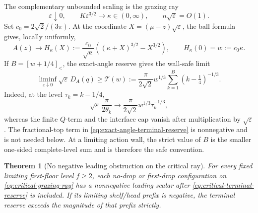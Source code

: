 \documentclass[11pt]{article}
\newtheorem{theorem}{Theorem}[section]
\theoremstyle{remark}
\newcommand{\sbr}[1]{[#1]_{<}}
\begin{document}
The complementary unbounded scaling is the grazing ray
\begin{equation}
 \varepsilon\downarrow0,\qquad
 K\varepsilon^{3/2}\longrightarrow\kappa\in(0,\infty),
 \qquad n\sqrt\varepsilon=O(1).
 \label{eq:critical-grazing-ray}
\end{equation}
Set $c_0=2\sqrt2/(3\pi)$.  At the coordinate
$X=(\mu-z)\sqrt\varepsilon$, the ball formula gives, locally uniformly,
\begin{equation}
 A(z)\longrightarrow
 H_\kappa(X):=\frac{c_0}{\sqrt\kappa}
 \left((\kappa+X)^{3/2}-X^{3/2}\right),
 \qquad H_\kappa(0)=w:=c_0\kappa.
 \label{eq:critical-action-profile}
\end{equation}
If $B=\sbr{w+1/4}$, the exact-angle reserve gives the wall-safe limit
\begin{equation}
 \liminf_{\varepsilon\downarrow0}
 \sqrt\varepsilon\,D_A(q)
 \geq\mathcal T(w):=
 \frac\pi{2\sqrt2}w^{1/3}
 \sum_{k=1}^{B}(k-\tfrac14)^{-1/3}.
 \label{eq:critical-terminal-reserve}
\end{equation}
Indeed, at the level $\tau_k=k-1/4$,
\[
 \sqrt\varepsilon\,\frac\pi{2\theta_k}
 \longrightarrow\frac\pi{2\sqrt2}w^{1/3}\tau_k^{-1/3},
\]
whereas the finite $Q$-term and the interface cap vanish after multiplication
by $\sqrt\varepsilon$.  The fractional-top term in
\eqref{eq:exact-angle-terminal-reserve} is nonnegative and is not needed
below.  At a limiting action wall, the strict value of $B$ is the smaller
one-sided complete-level sum and is therefore the safe convention.

\begin{theorem}[No negative leading obstruction on the critical ray]
\label{thm:critical-ray}
For every fixed limiting first-floor level $f\geq2$, each no-drop or
first-drop configuration on \eqref{eq:critical-grazing-ray} has a
nonnegative leading scalar after \eqref{eq:critical-terminal-reserve} is
included.  If its limiting shelf/head prefix is negative, the terminal
reserve exceeds the magnitude of that prefix strictly.
\end{theorem}
\end{document}
